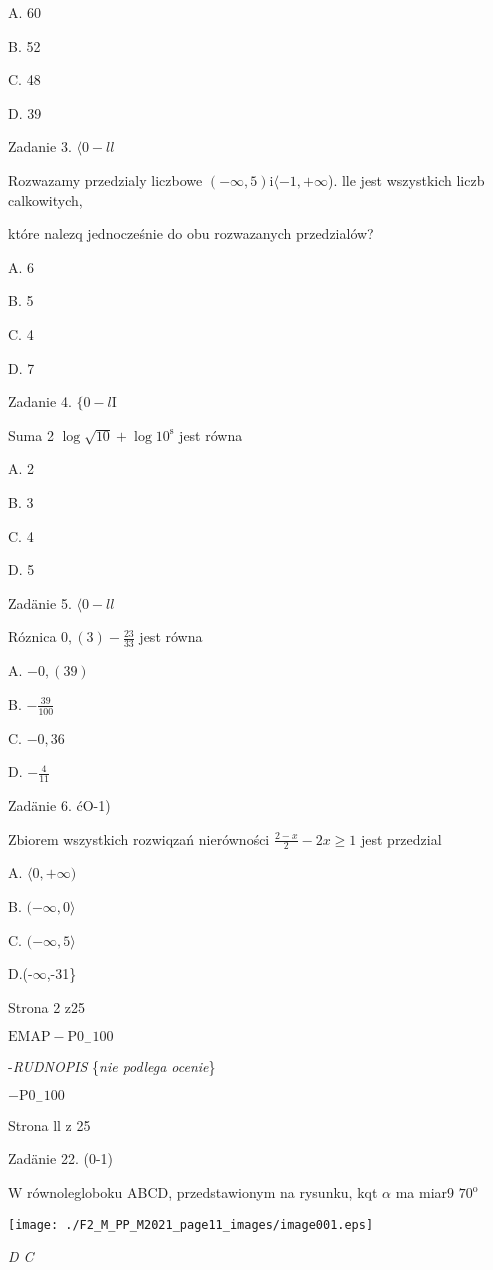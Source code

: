 \documentclass[a4paper,12pt]{article}
\begin{document}
A. 60

B. 52

C. 48

D. 39

Zadanie 3. $\langle 0-ll$

Rozwazamy przedzialy liczbowe $(-\infty,5) \mathrm{i} \langle-1, +\infty$). lle jest wszystkich liczb calkowitych,

które nalezq jednocześnie do obu rozwazanych przedzialów?

A. 6

B. 5

C. 4

D. 7

Zadanie 4. $\{0-l\mathrm{I}$

Suma 2 $\log\sqrt{10}+\log 10^{\mathrm{s}}$ jest równa

A. 2

B. 3

C. 4

D. 5

Zadänie 5. $\langle 0-ll$

Róznica $0,(3)-\displaystyle \frac{23}{33}$ jest równa

A. $-0,(39)$

B. $-\displaystyle \frac{39}{100}$

C. $-0,36$

D. $-\displaystyle \frac{4}{11}$

Zadänie 6. ćO-1)

Zbiorem wszystkich rozwiqzań nierówności $\displaystyle \frac{2-x}{2}-2x\geq 1$ jest przedzial

A. $\langle 0, +\infty)$

B. $(-\infty,  0\rangle$

C. $(-\infty,  5\rangle$

D.(-$\infty$,-31\}

Strona 2 z25

$\mathrm{E}\mathrm{M}\mathrm{A}\mathrm{P}-\mathrm{P}0_{-}100$





-{\it RUDNOPIS} \{{\it nie podlega ocenie}\}

$-\mathrm{P}0_{-}100$

Strona ll z 25





Zadänie 22. (0-1)

$\mathrm{W}$ równolegloboku ABCD, przedstawionym na rysunku, kqt $\alpha$ ma miar9 $70^{\mathrm{o}}$
\begin{center}
\texttt{[image: ./F2\_M\_PP\_M2021\_page11\_images/image001.eps]}
\end{center}
{\it D  C}
\end{document}
